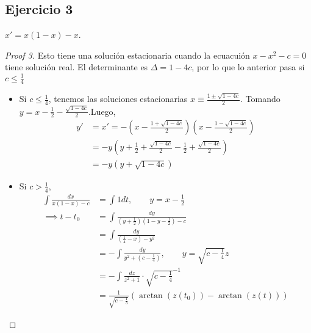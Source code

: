 \subsection*{Ejercicio 3}

\noindent $x' = x(1-x) - x$.

\begin{proof}[Proof 3]
	Esto tiene una solución estacionaria cuando la ecuacuión $x - x^2 - c = 0$ tiene solución real. El determinante es $\Delta = 1 - 4c$, por lo que lo anterior pasa si $c \leq \frac{1}{4}$
	\begin{itemize}
		\item Si $c \leq \frac{1}{4}$, tenemos las soluciones estacionarias $x \equiv \frac{1 \pm \sqrt{1-4c}}{2}$. Tomando $y = x - \frac{1}{2} - \frac{\sqrt{1-4c}}{2}$.Luego,
		\begin{align*}
			y' & =  x' = - \left( x - \frac{1 + \sqrt{1-4c}}{2} \right)\left(x - \frac{1-\sqrt{1-4c}}{2} \right) \\
			& = -y \left( y + \frac{1}{2} + \frac{\sqrt{1-4c}}{2} - \frac{1}{2} + \frac{\sqrt{1-4c}}{2} \right) \\
			& = -y (y + \sqrt{1-4c}) 
		\end{align*}

		\item Si $c > \frac{1}{4}$,
		\begin{align*}
			\int \frac{dx}{x(1-x)-c} &= \int 1 dt, \qquad y = x-\frac{1}{2} \\
			\implies t-t_0 &= \int \frac{dy}{\left(y+\frac{1}{2}\right)\left(1-y-\frac{1}{2}\right)-c} \\
			&= \int \frac{dy}{\left(\frac{1}{4}-x\right)-y^2} \\
			&= -\int \frac{dy}{y^2 + \left(c-\frac{1}{4}\right)}, \qquad y = \sqrt{c-\frac{1}{4}}z \\
			&= -\int \frac{dz}{z^2+1}\cdot\sqrt{c-\frac{1}{4}}^{-1} \\
			&= \frac{1}{\sqrt{c-\frac{1}{3}}}(\arctan (z(t_0)) - \arctan (z(t)))
		\end{align*}
	\end{itemize}
\end{proof}


